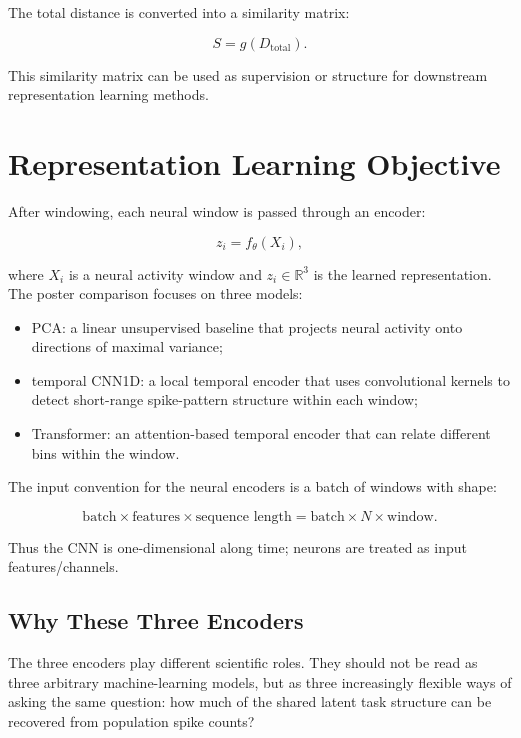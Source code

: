\documentclass[11pt]{article}
\begin{document}
The total distance is converted into a similarity matrix:

\begin{equation}
S = g(D_{\text{total}}).
\end{equation}

This similarity matrix can be used as supervision or structure for downstream
representation learning methods.

\section{Representation Learning Objective}

After windowing, each neural window is passed through an encoder:

\begin{equation}
z_i = f_\theta(X_i),
\end{equation}

where $X_i$ is a neural activity window and $z_i \in \mathbb{R}^3$ is the
learned representation. The poster comparison focuses on three models:

\begin{itemize}
    \item PCA: a linear unsupervised baseline that projects neural activity
    onto directions of maximal variance;
    \item temporal CNN1D: a local temporal encoder that uses convolutional
    kernels to detect short-range spike-pattern structure within each window;
    \item Transformer: an attention-based temporal encoder that can relate
    different bins within the window.
\end{itemize}

The input convention for the neural encoders is a batch of windows with shape:

\begin{equation}
\text{batch} \times \text{features} \times \text{sequence length}
=
\text{batch} \times N \times \text{window}.
\end{equation}

Thus the CNN is one-dimensional along time; neurons are treated as input
features/channels.

\subsection{Why These Three Encoders}

The three encoders play different scientific roles. They should not be read as
three arbitrary machine-learning models, but as three increasingly flexible
ways of asking the same question: how much of the shared latent task structure
can be recovered from population spike counts?
\end{document}

